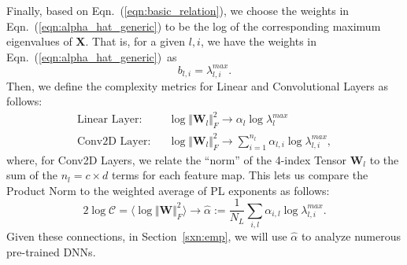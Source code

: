 
Finally, based on Eqn.~(\ref{eqn:basic_relation}), we choose the weights in Eqn.~(\ref{eqn:alpha_hat_generic}) to be the log of the corresponding maximum eigenvalues of $\mathbf{X}$.
That is, for a given $l,i$, we have the weights in Eqn.~(\ref{eqn:alpha_hat_generic})~as
$$
b_{l,i} = \lambda_{l,i}^{max}  .
$$
Then, we define the complexity metrics for Linear and Convolutional Layers as follows:
\begin{eqnarray*}
\text{Linear Layer:} & & \log\Vert\mathbf{W}_{l}\Vert^{2}_{F} 
\rightarrow 
\alpha_{l}\log\lambda_{l}^{max}  \\
\text{Conv2D Layer:} & & \log\Vert\mathbf{W}_{l}\Vert^{2}_{F} 
\rightarrow 
\sum_{i=1}^{n_{l}}\alpha_{l,i} \log\lambda_{l,i}^{max} , 
\end{eqnarray*}
where, for Conv2D Layers, we relate the ``norm'' of the 4-index Tensor $\mathbf{W}_{l}$ to the sum of the $n_{l}=c\times d$ terms for each feature map.
This lets us compare the Product Norm to the weighted average of PL exponents as follows:
\begin{equation}
2\log\mathcal{C}=\langle\log\Vert\mathbf{W}\Vert^{2}_{F}\rangle 
\rightarrow 
\hat{\alpha} := \dfrac{1}{N_{L}}\sum_{i,l}\alpha_{i,l}\log \lambda_{l,i}^{max}  .
\label{eqn:alpha_hat_specific}
\end{equation}
Given these connections, in Section~\ref{sxn:emp}, we will use $\hat{\alpha}$ to analyze numerous pre-trained DNNs.






